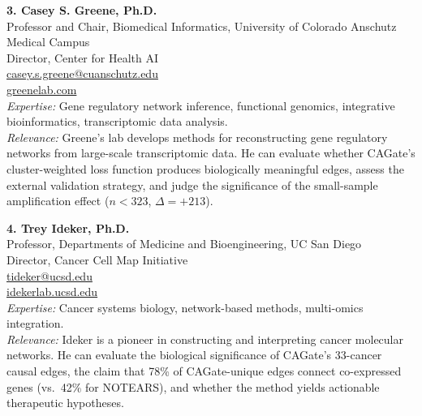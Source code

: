 \documentclass[12pt]{article}
\begin{document}
\vspace{0.4cm}

\noindent\textbf{3. Casey S. Greene, Ph.D.}\\
Professor and Chair, Biomedical Informatics, University of Colorado Anschutz Medical Campus\\
Director, Center for Health AI\\
\href{mailto:casey.s.greene@cuanschutz.edu}{casey.s.greene@cuanschutz.edu}\\
\href{https://greenelab.com}{greenelab.com}\\[4pt]
\textit{Expertise:} Gene regulatory network inference, functional genomics, integrative bioinformatics, transcriptomic data analysis.\\
\textit{Relevance:} Greene's lab develops methods for reconstructing gene regulatory networks from large-scale transcriptomic data. He can evaluate whether CAGate's cluster-weighted loss function produces biologically meaningful edges, assess the external validation strategy, and judge the significance of the small-sample amplification effect ($n < 323$, $\Delta = +213$).

\vspace{0.4cm}

\noindent\textbf{4. Trey Ideker, Ph.D.}\\
Professor, Departments of Medicine and Bioengineering, UC San Diego\\
Director, Cancer Cell Map Initiative\\
\href{mailto:tideker@ucsd.edu}{tideker@ucsd.edu}\\
\href{https://idekerlab.ucsd.edu}{idekerlab.ucsd.edu}\\[4pt]
\textit{Expertise:} Cancer systems biology, network-based methods, multi-omics integration.\\
\textit{Relevance:} Ideker is a pioneer in constructing and interpreting cancer molecular networks. He can evaluate the biological significance of CAGate's 33-cancer causal edges, the claim that 78\% of CAGate-unique edges connect co-expressed genes (vs.\ 42\% for NOTEARS), and whether the method yields actionable therapeutic hypotheses.

\vspace{0.4cm}
\end{document}
